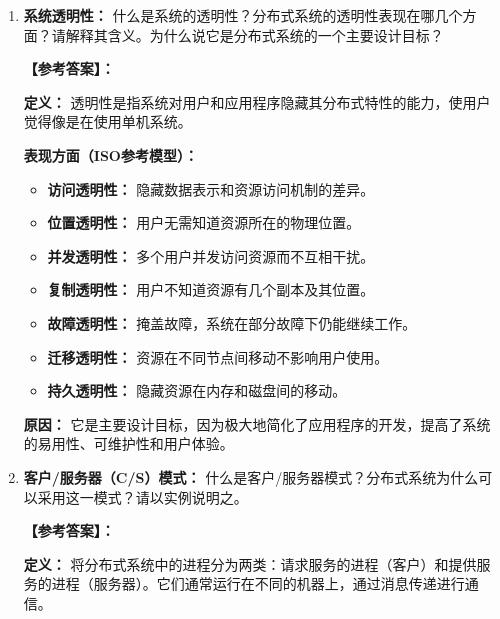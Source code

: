 \documentclass[a4paper,12pt]{article}
\newcommand{\answer}[1]{\par\vspace{0.5em}\hspace{2em}\textbf{【参考答案】：}\\{\color{blue}#1}\par\vspace{1em}}
\begin{document}
\begin{enumerate}[label=\arabic*.]
\begin{enumerate}
        \item 分布式系统与集中式计算机系统的主要区别是什么？
        
        \answer{
        \begin{itemize}
            \item \textbf{多处理机：} 分布式系统拥有多个自主的处理机。
            \item \textbf{无共享：} 分布式系统各节点没有全局共享内存，也没有全局时钟（时钟不同步）。
            \item \textbf{通信：} 分布式系统必须通过消息传递进行通信。
        \end{itemize}
        }
    \end{enumerate}

    \item \textbf{系统透明性：}
    什么是系统的透明性？分布式系统的透明性表现在哪几个方面？请解释其含义。为什么说它是分布式系统的一个主要设计目标？

    \answer{
    \textbf{定义：} 透明性是指系统对用户和应用程序隐藏其分布式特性的能力，使用户觉得像是在使用单机系统。
    
    \textbf{表现方面（ISO参考模型）：}
    \begin{itemize}
        \item \textbf{访问透明性：} 隐藏数据表示和资源访问机制的差异。
        \item \textbf{位置透明性：} 用户无需知道资源所在的物理位置。
        \item \textbf{并发透明性：} 多个用户并发访问资源而不互相干扰。
        \item \textbf{复制透明性：} 用户不知道资源有几个副本及其位置。
        \item \textbf{故障透明性：} 掩盖故障，系统在部分故障下仍能继续工作。
        \item \textbf{迁移透明性：} 资源在不同节点间移动不影响用户使用。
        \item \textbf{持久透明性：} 隐藏资源在内存和磁盘间的移动。
    \end{itemize}
    
    \textbf{原因：} 它是主要设计目标，因为极大地简化了应用程序的开发，提高了系统的易用性、可维护性和用户体验。
    }

    \item \textbf{客户/服务器（C/S）模式：}
    什么是客户/服务器模式？分布式系统为什么可以采用这一模式？请以实例说明之。

    \answer{
    \textbf{定义：} 将分布式系统中的进程分为两类：请求服务的进程（客户）和提供服务的进程（服务器）。它们通常运行在不同的机器上，通过消息传递进行通信。
    
}
\end{enumerate}
\end{document}
